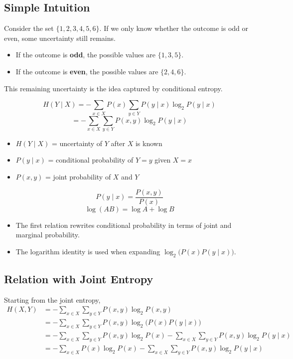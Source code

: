 \documentclass[11pt,a4paper]{book}
\newenvironment{formulabox}[1][Formula]{%
    \begin{tcolorbox}[
        enhanced,
        breakable,
        colback=softcoral!10,
        colframe=softcoral!200,
        title=#1,
        fonttitle=\bfseries,
        coltitle=white,
        sharp corners,
        boxrule=1pt,
        left=8pt,
        right=8pt,
        top=6pt,
        bottom=6pt
    ]
}{\end{tcolorbox}}
\begin{document}
\subsection{Simple Intuition}
Consider the set $\{1,2,3,4,5,6\}$. If we only know whether the outcome is odd or even, some uncertainty still remains.
\begin{itemize}
    \item If the outcome is \textbf{odd}, the possible values are $\{1,3,5\}$.
    \item If the outcome is \textbf{even}, the possible values are $\{2,4,6\}$.
\end{itemize}
This remaining uncertainty is the idea captured by conditional entropy.

\begin{formulabox}[Conditional Entropy Formula]
\[
H(Y \mid X) = -\sum_{x \in X} P(x)\sum_{y \in Y} P(y \mid x)\log_2 P(y \mid x)
\]
\[
= -\sum_{x \in X}\sum_{y \in Y} P(x,y)\log_2 P(y \mid x)
\]
\begin{itemize}
    \item $H(Y \mid X)$ = uncertainty of $Y$ after $X$ is known
    \item $P(y \mid x)$ = conditional probability of $Y=y$ given $X=x$
    \item $P(x,y)$ = joint probability of $X$ and $Y$
\end{itemize}
\end{formulabox}

\begin{formulabox}[Useful Relation for the Derivation]
\[
P(y \mid x)=\frac{P(x,y)}{P(x)}
\]
\[
\log(AB)=\log A+\log B
\]
\begin{itemize}
    \item The first relation rewrites conditional probability in terms of joint and marginal probability.
    \item The logarithm identity is used when expanding \(\log_2\bigl(P(x)P(y \mid x)\bigr)\).
\end{itemize}
\end{formulabox}

\subsection{Relation with Joint Entropy}
Starting from the joint entropy,
\begin{align*}
H(X,Y) &= -\sum_{x \in X}\sum_{y \in Y} P(x,y)\log_2 P(x,y) \\
&= -\sum_{x \in X}\sum_{y \in Y} P(x,y)\log_2\bigl(P(x)P(y \mid x)\bigr) \\
&= -\sum_{x \in X}\sum_{y \in Y} P(x,y)\log_2 P(x)
- \sum_{x \in X}\sum_{y \in Y} P(x,y)\log_2 P(y \mid x) \\
&= -\sum_{x \in X} P(x)\log_2 P(x)
- \sum_{x \in X}\sum_{y \in Y} P(x,y)\log_2 P(y \mid x)
\end{align*}
\end{document}
